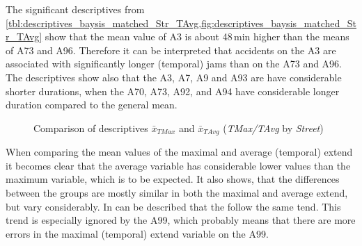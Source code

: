 The significant descriptives from \cref{tbl:descriptives_baysis_matched_Str_TAvg,fig:descriptives_baysis_matched_Str_TAvg} show that the mean value of A3 is about 48\,min higher than the means of A73 and A96. Therefore it can be interpreted that accidents on the A3 are associated with significantly longer (temporal) jams than on the A73 and A96. The descriptives show also that the A3, A7, A9 and A93 are have considerable shorter durations, when the A70, A73, A92, and A94 have considerable longer duration compared to the general mean.
\begin{figure}[ht!]
	\data
	\pgfplotstablesort[sort key=meanTAvg, sort cmp=float >]{\datasorted}{\data}
	\tiny
	\centering
	\caption{Comparison of descriptives $\bar{x}_{TMax}$ and $\bar{x}_{TAvg}$ (\textit{TMax/TAvg} by \textit{Street})}
	\label{fig:baysis_matched_meancomparison_Str_temporal}
\end{figure}
When comparing the mean values of the maximal and average (temporal) extend it becomes clear that the average variable has considerable lower values than the maximum variable, which is to be expected. It also shows, that the differences between the groups are mostly similar in both the maximal and average extend, but vary considerably. In can be described that the follow the same tend. This trend is especially ignored by the A99, which probably means that there are more errors in the maximal (temporal) extend variable on the A99.

